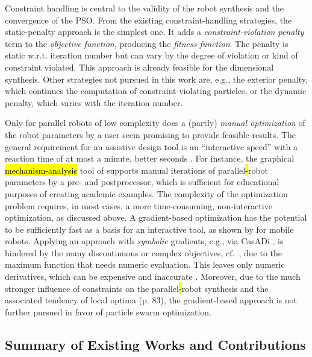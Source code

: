 Constraint handling \cite{Mezura-MontesCoe2011,Jordehi2015} is central to the validity of the robot synthesis and the convergence of the PSO.
From the existing constraint-handling strategies, the static-penalty approach is the simplest one. 
It adds a \emph{constraint-violation penalty} term to the \emph{objective function}, producing the \emph{fitness function}.
The penalty is static w.r.t. iteration number but can vary by the degree of violation or kind of constraint violated.
This approach is already feasible for the dimensional synthesis.
Other strategies not pursued in this work are, e.g., the exterior penalty, which continues the computation of constraint-violating particles, or the dynamic penalty, which varies with the iteration number.



%
%
%
%
%
%
%

%
%
%
%
%
%
%
%
%
%
%
%
%
Only for parallel robots of low complexity does a (partly) \emph{manual optimization} of the robot parameters by a user seem promising to provide feasible results.
The general requirement for an assistive design tool is an 
``interactive speed'' with a reaction time of at most a minute, better seconds \cite{Dinev2023}.
For instance, the graphical \hl{mechanism-analysis} tool of \cite{PetuyaMacAltPin2014} supports manual iterations of parallel\hl{-}robot parameters by a pre- and postprocessor, which is sufficient for educational purposes of creating academic examples.
The complexity of the optimization problem requires, in most cases, a more time-consuming, non-interactive optimization, as discussed above.
A gradient-based optimization has the potential to be sufficiently fast as a basis for an interactive tool, as shown by \cite{Dinev2023} for mobile robots.
Applying an approach with \emph{symbolic} gradients, e.g., via CasADi \cite{AnderssonGilHorRaw2019}, is hindered by the many discontinuous or complex objectives, cf.~\cite{SalunkheMicKumSan2022}, due to the maximum function that needs numeric evaluation.
%
%
%
This leaves only numeric derivatives, which can be expensive and inaccurate \cite{SpielbergAraSunTed2017}.
Moreover, due to the much stronger influence of constraints on the parallel\hl{-}robot synthesis and the associated tendency of local optima \cite{Kirchner2000} (p. 83), the gradient-based approach is not further pursued in favor of particle swarm optimization.


\subsection{Summary of Existing Works {and Contributions}}


